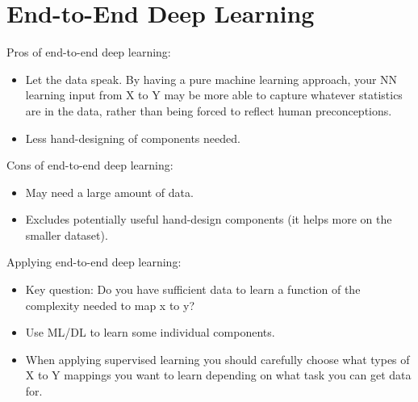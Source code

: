 \section{End-to-End Deep Learning}

Pros of end-to-end deep learning:

\begin{itemize}[wide, labelwidth=!, labelindent=0pt]
\itemsep0em 
    \item Let the data speak. By having a pure machine learning approach, your NN learning input from X to Y may be more able to capture whatever statistics are in the data, rather than being forced to reflect human preconceptions.
    \item Less hand-designing of components needed. \vspace*{-\baselineskip}
\end{itemize}


Cons of end-to-end deep learning:

\begin{itemize}[wide, labelwidth=!, labelindent=0pt]
\itemsep0em 
    \item May need a large amount of data.
    \item Excludes potentially useful hand-design components (it helps more on the smaller dataset). \vspace*{-\baselineskip}
\end{itemize}

Applying end-to-end deep learning:

\begin{itemize}[wide, labelwidth=!, labelindent=0pt]
\itemsep0em 
    \item Key question: Do you have sufficient data to learn a function of the complexity needed to map x to y?
    \item Use ML/DL to learn some individual components.
    \item When applying supervised learning you should carefully choose what types of X to Y mappings you want to learn depending on what task you can get data for. \vspace*{-\baselineskip}
\end{itemize}